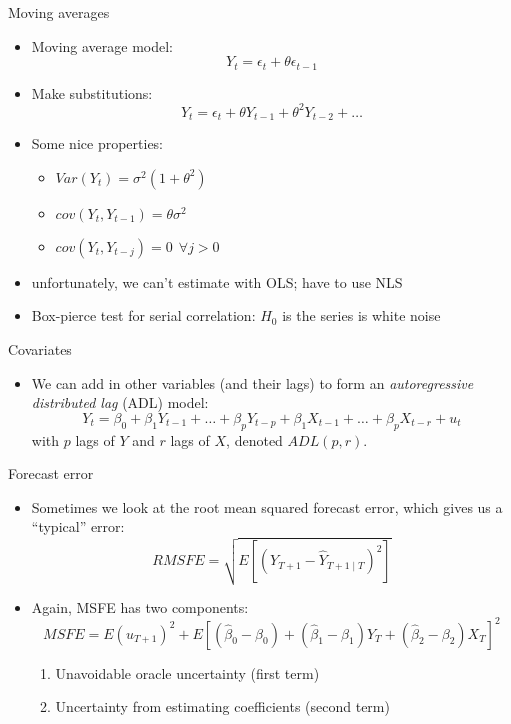 \documentclass[aspectratio=169]{beamer}
\begin{document}
\begin{frame}{Moving averages}
    \begin{itemize}
        \item Moving average model:
        $$
         Y_t = \epsilon_t + \theta \epsilon_{t-1}
        $$
       \item Make substitutions:
       $$
        Y_t = \epsilon_t + \theta Y_{t-1} + \theta^2 Y_{t-2} + \dots
       $$
       \item Some nice properties:
       \begin{itemize}
        \item $Var(Y_t) = \sigma^2 ( 1 +\theta^2)$
        \item $cov(Y_t, Y_{t-1}) = \theta \sigma^2$
        \item $cov(Y_t, Y_{t-j}) = 0 ~~ \forall j>0$
    \end{itemize}
        \item unfortunately, we can't estimate with OLS; have to use NLS
        \item Box-pierce test for serial correlation: $H_0$ is the series is white noise
    \end{itemize}
\end{frame}


\begin{frame}{Covariates}
    \begin{itemize}
       \item We can add in other variables (and their lags) to form an \textit{autoregressive distributed lag} (ADL) model:
       $$
       Y_t = \beta_0 + \beta_1 Y_{t-1} + \dots + \beta_p Y_{t-p} + \beta_1 X_{t-1} + \dots + \beta_p X_{t-r} + u_t
      $$
      with $p$ lags of $Y$ and $r$ lags of $X$, denoted $ADL(p,r)$.
    \end{itemize}
\end{frame}

\begin{frame}{Forecast error}
    \begin{itemize}
       \item Sometimes we look at the root mean squared forecast error, which gives us a ``typical'' error:
       $$
        RMSFE = \sqrt{E\left[\left(Y_{T+1}-\hat{Y}_{T+1 \mid T}\right)^2\right]}
       $$
       \item Again, MSFE has two components:
       $$
        MSFE = E\left(u_{T+1}\right)^2+E\left[\left(\hat{\beta}_0-\beta_0\right)+\left(\hat{\beta}_1-\beta_1\right) Y_T+\left(\hat{\beta}_2-\beta_2\right) X_T\right]^2
       $$
       \begin{enumerate}
        \item Unavoidable oracle uncertainty (first term)
        \item Uncertainty from estimating coefficients (second term)
       \end{enumerate}
    \end{itemize}
\end{frame}
\end{document}
